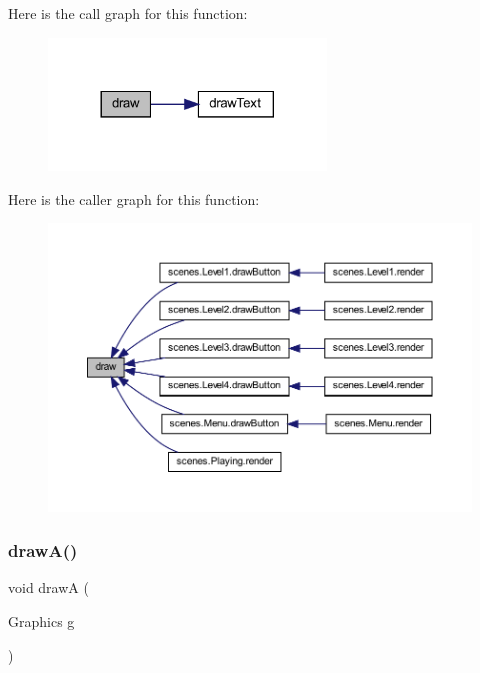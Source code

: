 Here is the call graph for this function\+:\nopagebreak
\begin{figure}[H]
\begin{center}
\leavevmode
\includegraphics[width=209pt]{classui_1_1_my_button_a72fe1ffca978e99fd16994a10e7f8051_cgraph}
\end{center}
\end{figure}
Here is the caller graph for this function\+:\nopagebreak
\begin{figure}[H]
\begin{center}
\leavevmode
\includegraphics[width=350pt]{classui_1_1_my_button_a72fe1ffca978e99fd16994a10e7f8051_icgraph}
\end{center}
\end{figure}
\mbox{\label{classui_1_1_my_button_a73a12c436143ada4de08e87bb3513ab1}} 
\subsubsection{\texorpdfstring{draw\+A()}{drawA()}}
{\footnotesize\ttfamily void drawA (\begin{DoxyParamCaption}\item[{Graphics}]{g }\end{DoxyParamCaption})}



